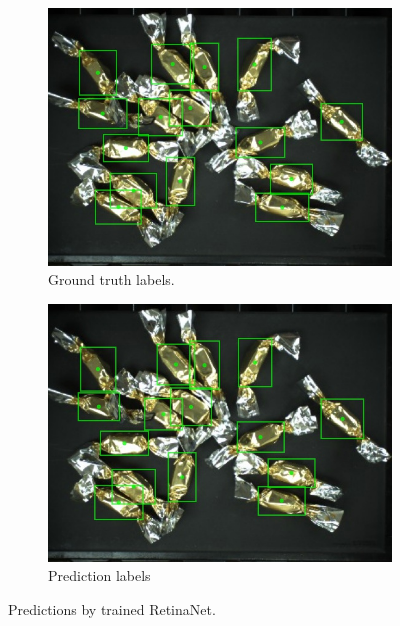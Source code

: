 \begin{figure}[H]
\begin{subfigure}{0.5\textwidth}
  \end{subfigure}
  \begin{subfigure}{0.5\textwidth}
    \centering
    \includegraphics[width=\linewidth]{Sources/Figures/appendix/actual_80.jpg}
    \caption{Ground truth labels.}

  \end{subfigure}
  \begin{subfigure}{0.5\textwidth}
    \centering
    \includegraphics[width=\linewidth]{Sources/Figures/appendix/pred_80.jpg}
    \caption{Prediction labels}

  \end{subfigure}
  \caption{Predictions by trained RetinaNet.}
  \label{fig:candies_appendix1}
\end{figure}

